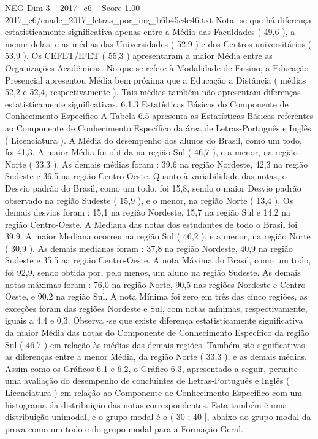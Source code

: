 \begin{textsample}{NEG Dim 3 – 2017\_c6 – Score 1.00 – 2017\_c6/enade\_2017\_letras\_por\_ing\_b6b45c4c46.txt}
Nota -se que há diferença estatisticamente significativa apenas entre a Média das Faculdades ( 49,6 ), a menor delas, e as médias das Universidades ( 52,9 ) e dos Centros universitários ( 53,9 ).
Os CEFET/IFET ( 55,3 ) apresentaram a maior Média entre as Organizações Acadêmicas.
No que se refere à Modalidade de Ensino, a Educação Presencial apresentou Média bem próxima que a Educação a Distância ( médias 52,2 e 52,4, respectivamente ).
Tais médias também não apresentam diferenças estatisticamente significativas. 6.1.3 Estatísticas Básicas do Componente de Conhecimento Específico A Tabela 6.5 apresenta as Estatísticas Básicas referentes ao Componente de Conhecimento Específico da área de Letras-Português e Inglês ( Licenciatura ).
A Média do desempenho dos alunos do Brasil, como um todo, foi 41,3.
A maior Média foi obtida na região Sul ( 46,7 ), e a menor, na região Norte ( 33,3 ).
As demais médias foram : 39,6 na região Nordeste, 42,3 na região Sudeste e 36,5 na região Centro-Oeste.
Quanto à variabilidade das notas, o Desvio padrão do Brasil, como um todo, foi 15,8, sendo o maior Desvio padrão observado na região Sudeste ( 15,9 ), e o menor, na região Norte ( 13,4 ).
Os demais desvios foram : 15,1 na região Nordeste, 15,7 na região Sul e 14,2 na região Centro-Oeste.
A Mediana das notas dos estudantes de todo o Brasil foi 39,9.
A maior Mediana ocorreu na região Sul ( 46,2 ), e a menor, na região Norte ( 30,9 ).
As demais medianas foram : 37,8 na região Nordeste, 40,9 na região Sudeste e 35,5 na região Centro-Oeste.
A nota Máxima do Brasil, como um todo, foi 92,9, sendo obtida por, pelo menos, um aluno na região Sudeste.
As demais notas máximas foram : 76,0 na região Norte, 90,5 nas regiões Nordeste e Centro-Oeste, e 90,2 na região Sul.
A nota Mínima foi zero em três das cinco regiões, as exceções foram das regiões Nordeste e Sul, com notas mínimas, respectivamente, iguais a 4,4 e 0,3.
Observa -se que existe diferença estatisticamente significativa da maior Média das notas do Componente de Conhecimento Específico da região Sul ( 46,7 ) em relação às médias das demais regiões.
Também são significativas as diferenças entre a menor Média, da região Norte ( 33,3 ), e as demais médias.
Assim como os Gráficos 6.1 e 6.2, o Gráfico 6.3, apresentado a seguir, permite uma avaliação do desempenho de concluintes de Letras-Português e Inglês ( Licenciatura ) em relação ao Componente de Conhecimento Específico com um histograma da distribuição das notas correspondentes.
Esta também é uma distribuição unimodal, e o grupo modal é o ( 30 ; 40 ], abaixo do grupo modal da prova como um todo e do grupo modal para a Formação Geral.

\end{textsample}
